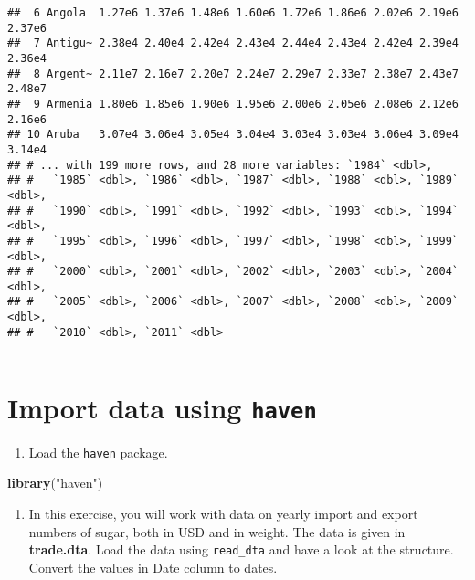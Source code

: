 \documentclass[]{article}
\newenvironment{Shaded}{\begin{snugshade}}{\end{snugshade}}
\newcommand{\KeywordTok}[1]{\textcolor[rgb]{0.13,0.29,0.53}{\textbf{#1}}}
\newcommand{\StringTok}[1]{\textcolor[rgb]{0.31,0.60,0.02}{#1}}
\newcommand{\NormalTok}[1]{#1}
\providecommand{\tightlist}{%
  \setlength{\itemsep}{0pt}\setlength{\parskip}{0pt}}
\begin{document}
\begin{verbatim}
##  6 Angola  1.27e6 1.37e6 1.48e6 1.60e6 1.72e6 1.86e6 2.02e6 2.19e6 2.37e6
##  7 Antigu~ 2.38e4 2.40e4 2.42e4 2.43e4 2.44e4 2.43e4 2.42e4 2.39e4 2.36e4
##  8 Argent~ 2.11e7 2.16e7 2.20e7 2.24e7 2.29e7 2.33e7 2.38e7 2.43e7 2.48e7
##  9 Armenia 1.80e6 1.85e6 1.90e6 1.95e6 2.00e6 2.05e6 2.08e6 2.12e6 2.16e6
## 10 Aruba   3.07e4 3.06e4 3.05e4 3.04e4 3.03e4 3.03e4 3.06e4 3.09e4 3.14e4
## # ... with 199 more rows, and 28 more variables: `1984` <dbl>,
## #   `1985` <dbl>, `1986` <dbl>, `1987` <dbl>, `1988` <dbl>, `1989` <dbl>,
## #   `1990` <dbl>, `1991` <dbl>, `1992` <dbl>, `1993` <dbl>, `1994` <dbl>,
## #   `1995` <dbl>, `1996` <dbl>, `1997` <dbl>, `1998` <dbl>, `1999` <dbl>,
## #   `2000` <dbl>, `2001` <dbl>, `2002` <dbl>, `2003` <dbl>, `2004` <dbl>,
## #   `2005` <dbl>, `2006` <dbl>, `2007` <dbl>, `2008` <dbl>, `2009` <dbl>,
## #   `2010` <dbl>, `2011` <dbl>
\end{verbatim}

\begin{center}\rule{0.5\linewidth}{\linethickness}\end{center}

\section{\texorpdfstring{Import data using
\texttt{haven}}{Import data using haven}}\label{import-data-using-haven}

\begin{enumerate}
\def\labelenumi{\arabic{enumi}.}
\tightlist
\item
  Load the \texttt{haven} package.
\end{enumerate}

\begin{Shaded}
\begin{Highlighting}[]
\KeywordTok{library}\NormalTok{(}\StringTok{"haven"}\NormalTok{)}
\end{Highlighting}
\end{Shaded}

\begin{enumerate}
\def\labelenumi{\arabic{enumi}.}
\setcounter{enumi}{1}
\tightlist
\item
  In this exercise, you will work with data on yearly import and export
  numbers of sugar, both in USD and in weight. The data is given in
  \textbf{trade.dta}. Load the data using \texttt{read\_dta} and have a
  look at the structure. Convert the values in Date column to dates.
\end{enumerate}
\end{document}
